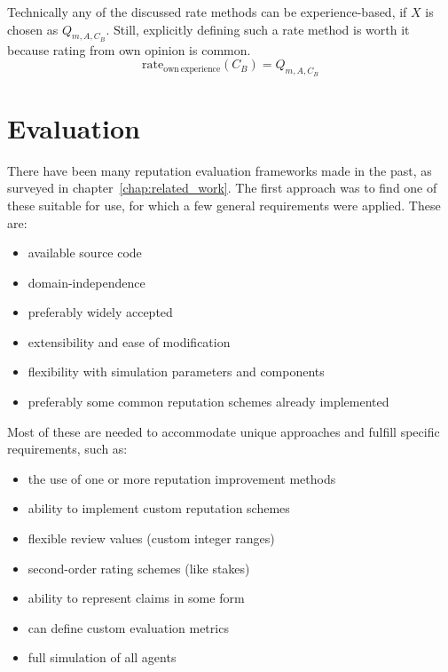 \documentclass[%
    ]{\PathToTumTemplate/thesis/tum_thesis}
\begin{document}
Technically any of the discussed rate methods can be experience-based, if $X$ is chosen as $Q_{m,A,C_{B}}$.
Still, explicitly defining such a rate method is worth it because rating from own opinion is common.
\begin{equation}\label{eq:rate_own_experience}
\mathrm{rate_{own~experience}}(C_B) = Q_{m,A,C_{B}}
\end{equation}



\section{Evaluation}\label{sec:approach_evaluation_framework}


There have been many reputation evaluation frameworks made in the past, as surveyed in chapter~\ref{chap:related_work}.
The first approach was to find one of these suitable for use, for which a few general requirements were applied.
These are:
\begin{itemize}
    \item available source code
    \item domain-independence
    \item preferably widely accepted
    \item extensibility and ease of modification
    \item flexibility with simulation parameters and components
    \item preferably some common reputation schemes already implemented
\end{itemize}

Most of these are needed to accommodate unique approaches and fulfill specific requirements, such as:
\begin{itemize}
    \item the use of one or more reputation improvement methods
	\item ability to implement custom reputation schemes
    \item flexible review values (custom integer ranges)
    \item second-order rating schemes (like stakes)
    \item ability to represent \glspl{claim} in some form
    \item can define custom evaluation metrics
    \item full simulation of all agents
\end{itemize}
\end{document}
